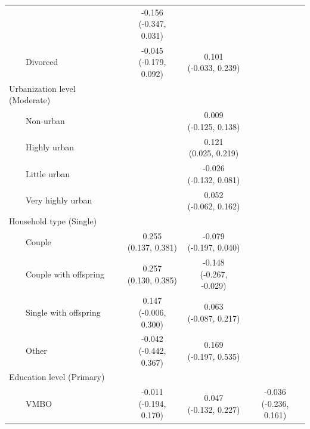 \documentclass[12pt]{article}
\begin{document}
\begin{appendices}
\begin{longtable}{lccc}
        & \makecell{ -0.156 \\ [-1ex] (-0.347, 0.031) }
        &  \\ 
    ~~~~Divorced & \makecell{ -0.045 \\ [-1ex] (-0.179, 0.092) }
        & \makecell{ 0.101 \\ [-1ex] (-0.033, 0.239) }
        &  \\ 
    Urbanization level (Moderate) & & & \\
    ~~~~Non-urban & 
    	& \makecell{ 0.009 \\ [-1ex] (-0.125, 0.138) }
    	&  \\ 
    ~~~~Highly urban & 
    	& \makecell{ 0.121 \\ [-1ex] (0.025, 0.219) }
    	&  \\ 
    ~~~~Little urban & 
    	& \makecell{ -0.026 \\ [-1ex] (-0.132, 0.081) }
    	&  \\ 
    ~~~~Very highly urban &
    	& \makecell{ 0.052 \\ [-1ex] (-0.062, 0.162) }
    	&  \\ 
    Household type (Single) & & & \\
    ~~~~Couple & \makecell{ 0.255 \\ [-1ex] (0.137, 0.381) }
    	& \makecell{ -0.079 \\ [-1ex] (-0.197, 0.040) }
    	&  \\ 
    ~~~~Couple with offspring & \makecell{ 0.257 \\ [-1ex] (0.130, 0.385) }
    	& \makecell{ -0.148 \\ [-1ex] (-0.267, -0.029) }
    	&  \\ 
    ~~~~Single with offspring & \makecell{ 0.147 \\ [-1ex] (-0.006, 0.300) }
    	& \makecell{ 0.063 \\ [-1ex] (-0.087, 0.217) }
    	&  \\ 
    ~~~~Other & \makecell{ -0.042 \\ [-1ex] (-0.442, 0.367) }
    	& \makecell{ 0.169 \\ [-1ex] (-0.197, 0.535) }
    	&  \\ 
    Education level (Primary) & & & \\
    ~~~~VMBO & \makecell{ -0.011 \\ [-1ex] (-0.194, 0.170) }
    	& \makecell{ 0.047 \\ [-1ex] (-0.132, 0.227) }
    	& \makecell{ -0.036 \\ [-1ex] (-0.236, 0.161) } \\ 

\end{longtable}
\end{appendices}
\end{document}
